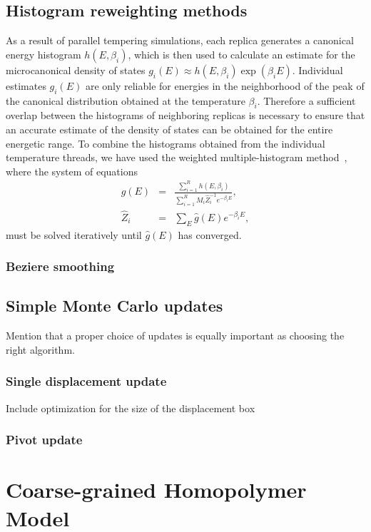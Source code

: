 \documentclass[12pt]{report}
\begin{document}
\section{Histogram reweighting methods}
As a result of parallel tempering simulations, each replica generates 
a canonical energy histogram $h(E,\beta_{i})$,
which is then used to calculate an estimate for the microcanonical density 
of states $g_{i}(E) \approx h(E,\beta_{i})\exp{(\beta _{i} E)}$.
Individual estimates $g_{i}(E)$ are only reliable for energies in the
neighborhood 
of the peak of the canonical distribution obtained at the temperature
$\beta _{i}$.
Therefore a sufficient overlap between the histograms of
neighboring replicas 
is necessary to ensure that an accurate estimate of the density of states 
can be
obtained for the entire energetic range. To combine the histograms obtained
from the individual temperature threads, we have used the weighted
multiple-histogram 
method~\cite{Ferrenberg1989,Kumar1992}, where the system of equations
\begin{eqnarray}
\hat{g}(E)&= &\frac{\sum_{i=1}^{R} h(E,\beta _{i})}{\sum_{i=1}^{R} M_i
\hat{Z}_i^{-1} e^{-\beta_i E}}, \\
\hat{Z}_i &= &\sum_E \hat{g}(E) e^{-\beta_i E},
\end{eqnarray}
%
must be solved iteratively until $\hat{g}(E)$ has converged.
\subsection{Beziere smoothing}
\section{Simple Monte Carlo updates}
Mention that a proper choice of updates is equally important as choosing the right algorithm.
\subsection{Single displacement update}
Include optimization for the size of the displacement box
\subsection{Pivot update}





\chapter{Coarse-grained Homopolymer Model}
\end{document}
